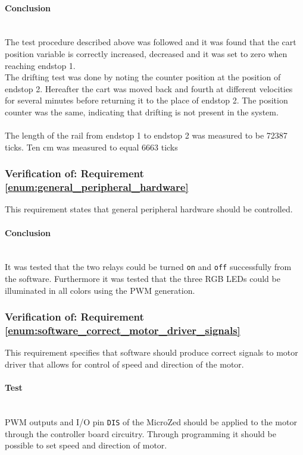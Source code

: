 \paragraph{Conclusion}~\\
The test procedure described above was followed and it was found that the cart position variable is correctly increased, decreased and it was set to zero when reaching endstop 1.
\\
The drifting test was done by noting the counter position at the position of endstop 2. 
Hereafter the cart was moved back and fourth at different velocities for several minutes before returning it to the place of endstop 2. 
The position counter was the same, indicating that drifting is not present in the system.
\\~\\
The length of the rail from endstop 1 to endstop 2 was measured to be 72387 ticks.
Ten cm was measured to equal 6663 ticks

\subsubsection{Verification of: Requirement \ref{enum:general_peripheral_hardware}} %
\label{ssub:verification_of_requirement_enum:general_peripheral_hardware}
This requirement states that general peripheral hardware should be controlled.

\paragraph{Conclusion}~\\
It was tested that the two relays could be turned \texttt{on} and \texttt{off} successfully from the software.
Furthermore it was tested that the three RGB LEDs could be illuminated in all colors using the PWM generation.


\subsubsection{Verification of: Requirement \ref{enum:software_correct_motor_driver_signals}} %
\label{ssub:verification_of_requirement_enum:software_correct_motor_driver_signals}
This requirement specifies that software should produce correct signals to motor driver that allows for control of speed and direction of the motor.

\paragraph{Test}~\\
PWM outputs and I/O pin \texttt{DIS} of the MicroZed should be applied to the motor through the controller board circuitry.
Through programming it should be possible to set speed and direction of motor.

